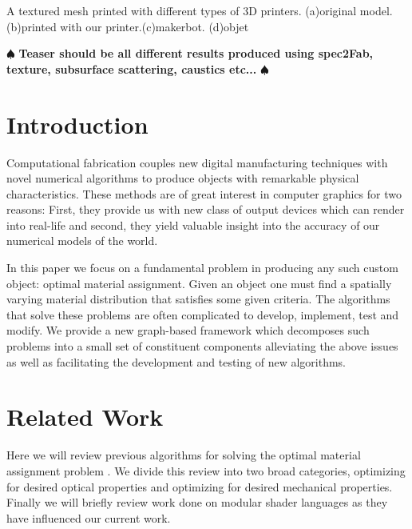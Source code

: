 \documentclass[annual]{acmsiggraph}
\newcommand{\note}[1]{\marginpar{\LARGE $\spadesuit$}
			$\spadesuit$ {\bf #1} $\spadesuit$}
\begin{document}
{\begin{subfigure}[b]{0.18\textwidth}
                \caption{}
                \label{teaser:objet}
        \end{subfigure}
        \caption{A textured mesh printed with different types of 3D printers.
        	(a)original model.(b)printed with our printer.(c)makerbot.
        	(d)objet}\label{teaser}
	\label{fig:texture}
 }

\maketitle

\begin{abstract}


\end{abstract}

\keywordlist

\TOGlinkslist

\copyrightspace

\note{Teaser should be all different results produced using spec2Fab, texture, subsurface scattering, caustics etc...}


\section{Introduction}
Computational fabrication couples new digital manufacturing techniques with novel numerical algorithms to produce objects with remarkable physical characteristics. These methods are of great interest in computer graphics for two reasons: First, they provide us with  new class of output devices which can render into  real-life and second, they yield valuable insight into the accuracy of our numerical models of the world.  

In this paper we focus on a fundamental problem in producing any such custom object:  optimal material assignment. Given an object one must find a spatially varying material distribution that satisfies some given criteria. The algorithms that solve these problems are often complicated to develop, implement, test and modify. We provide a new graph-based framework which decomposes such problems into a small set of constituent components alleviating the above issues as well as facilitating the development and testing of new algorithms. 

\section{Related Work} 
Here we will review previous algorithms for solving the optimal material assignment problem . We divide this review into two broad categories, optimizing for desired optical properties and optimizing for desired mechanical properties. Finally we will briefly review work done on modular shader languages as they have influenced our current work.
\end{document}
